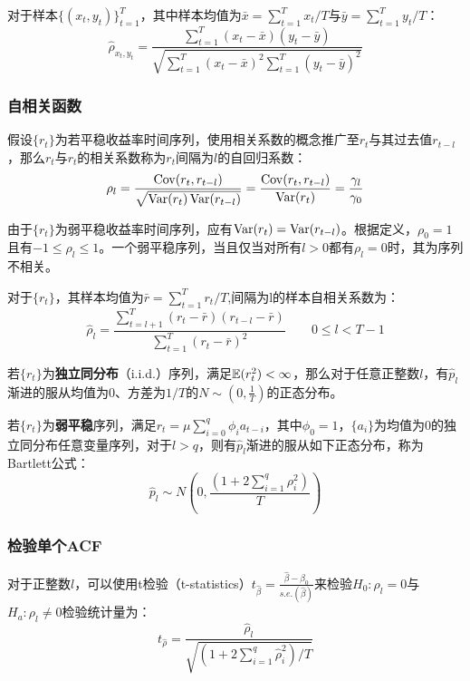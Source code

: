 \documentclass[11pt]{article}
\begin{document}
对于样本$\{(x_t,y_t)\}_{t=1}^{T}$，其中样本均值为$\bar{x}=\sum_{t=1}^{T}x_t/T$与$\bar{y}=\sum_{t=1}^{T}y_t/T$：
\begin{equation*}
    \hat{\rho}_{x_t,y_t} = \frac{\sum_{t=1}^{T}(x_t-\bar{x})(y_t-\bar{y})}{\sqrt{\sum_{t=1}^{T}(x_t-\bar{x})^2 \sum_{t=1}^{T}(y_t-\bar{y})^2}}
\end{equation*}

\subsubsection{自相关函数}

假设$\{r_t\}$为若平稳收益率时间序列，使用相关系数的概念推广至$r_t$与其过去值$r_{t-l}$，那么$r_t$与$r_{t}$的相关系数称为$r_t$间隔为$l$的自回归系数：
\begin{equation*}
    \rho_l = \frac{\operatorname{Cov}(r_t,r_{t-l})}{\sqrt{\operatorname{Var}(r_t)\operatorname{Var}(r_{t-l})}} 
    = \frac{\operatorname{Cov}(r_t,r_{t-l})}{\operatorname{Var}(r_t)}
    = \frac{\gamma_l}{\gamma_0}
\end{equation*}

由于$\{r_t\}$为弱平稳收益率时间序列，应有$\operatorname{Var}(r_t) = \operatorname{Var}(r_{t-l})$。根据定义，$\rho_0=1$且有$-1 \leq \rho_l \leq 1$。一个弱平稳序列，当且仅当对所有$l>0$都有$\rho_l=0$时，其为序列不相关。

对于$\{r_t\}$，其样本均值为$\bar{r}=\sum_{t=1}^{T}r_t/T$,间隔为l的样本自相关系数为：
\begin{equation*}
    \hat{\rho}_l = \frac{\sum_{t=l+1}^{T}(r_t-\bar{r})(r_{t-l}-\bar{r})}{\sum_{t=1}^{T}(r_t-\bar{r})^2} \qquad 0 \leq l < T-1
\end{equation*}

若$\{r_t\}$为\textbf{独立同分布}（i.i.d.）序列，满足$\mathbb{E}(r_t^2)<\infty$，那么对于任意正整数$l$，有$\hat{p}_l$渐进的服从均值为$0$、方差为$1/T$的$N\sim(0,\frac{1}{T})$的正态分布。

若$\{r_t\}$为\textbf{弱平稳}序列，满足$r_t = \mu \sum_{i=0}^{q}\phi_i a_{t-i}$，其中$\phi_0=1$，$\{a_i\}$为均值为0的独立同分布任意变量序列，对于$l>q$，则有$\hat{p}_l$渐进的服从如下正态分布，称为Bartlett公式：
\begin{equation*}
    \hat{p}_l \sim N\left(0,\frac{\left( 1+2\sum_{i=1}^{q}\rho_i^2 \right)}{T} \right)    
\end{equation*}

\subsubsection*{检验单个ACF}

对于正整数$l$，可以使用t检验（t-statistics）$t_{\hat{\beta}} = \frac{\hat{\beta}-\beta_0}{s.e.(\hat{\beta})}$来检验$H_0: \rho_l =0$与$H_a: \rho_l \neq 0$检验统计量为：
\begin{equation*}
    t_{\hat{\rho}} = \frac{\hat{\rho}_l}{\sqrt{\left( 1+2\sum_{i=1}^{q}\hat{\rho}_i^2 \right)/T}}
\end{equation*}
\end{document}
